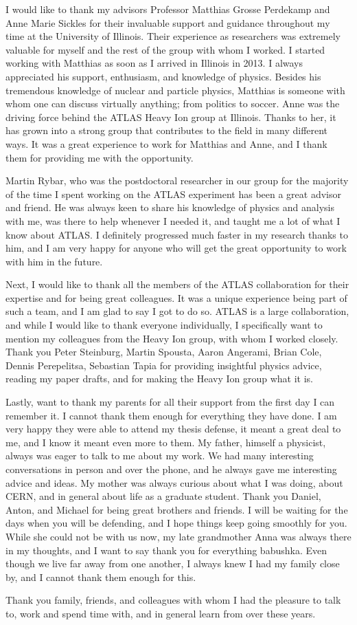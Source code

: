 I would like to thank my advisors Professor Matthias Grosse Perdekamp and Anne Marie Sickles for their invaluable support and guidance throughout my time at the University of Illinois. Their experience as researchers was extremely valuable for myself and the rest of the group with whom I worked. I started working with Matthias as soon as I arrived in Illinois in 2013. I always appreciated his support, enthusiasm, and knowledge of physics. Besides his tremendous knowledge of nuclear and particle physics, Matthias is someone with whom one can discuss virtually anything; from politics to soccer. Anne was the driving force behind the ATLAS Heavy Ion group at Illinois. Thanks to her, it has grown into a strong group that contributes to the field in many different ways. It was a great experience to work for Matthias and Anne, and I thank them for providing me with the opportunity.

Martin Rybar, who was the postdoctoral researcher in our group for the majority of  the time I spent working on the ATLAS experiment has been a great advisor and friend. He was always keen to share his knowledge of physics and analysis with me, was there to help whenever I needed it, and taught me a lot of what I know about ATLAS. I definitely progressed much faster in my research thanks to him, and I am very happy for anyone who will get the great opportunity to work with him in the future. 

Next, I would like to thank all the members of the ATLAS collaboration for their expertise and for being great colleagues. It was a unique experience being part of such a team, and I am glad to say I got to do so. ATLAS is a large collaboration, and while I would like to thank everyone individually, I specifically want to mention my colleagues from the Heavy Ion group, with whom I worked closely. Thank you Peter Steinburg, Martin Spousta, Aaron Angerami, Brian Cole, Dennis Perepelitsa, Sebastian Tapia for providing insightful physics advice, reading my paper drafts, and for making the Heavy Ion group what it is. 

Lastly, want to thank my parents for all their support from the first day I can remember it. I cannot thank them enough for everything they have done. I am very happy they were able to attend my thesis defense, it meant a great deal to me, and I know it meant even more to them. My father, himself a physicist, always was eager to talk to me about my work. We had many interesting conversations in person and over the phone, and he always gave me interesting advice and ideas. My mother was always curious about what I was doing, about CERN, and in general about life as a graduate student. Thank you Daniel, Anton, and Michael for being great brothers and friends. I will be waiting for the days when you will be defending, and I hope things keep going smoothly for you. While she could not be with us now, my late grandmother Anna was always there in my thoughts, and I want to say thank you for everything babushka. Even though we live far away from one another, I always knew I had my family close by, and I cannot thank them enough for this.

Thank you family, friends, and colleagues with whom I had the pleasure to talk to, work and spend time with, and in general learn from over these years. 
